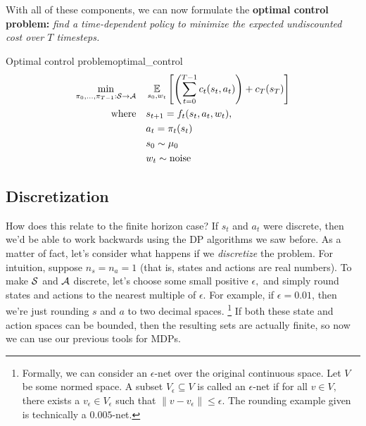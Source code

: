 \documentclass[../main/main]{subfiles}
\begin{document}
With all of these components, we can now formulate the \textbf{optimal control problem:} \emph{find a time-dependent policy to minimize the expected undiscounted cost over $T$ timesteps.}

\begin{definition}{Optimal control problem}{optimal_control}
    \begin{equation}
        \begin{split}
            \min_{\pi_0, \dots, \pi_{T-1} : \S \to \A} \quad & \E_{s_0, w_t} \left[
                \left( \sum_{t=0}^{T-1} c_t(s_t, a_t) \right) + c_T(s_T)
            \right] \\
            \text{where} \quad & s_{t+1} = f_t(s_t, a_t, w_t), \\
            & a_t = \pi_t(s_t) \\
            & s_0 \sim \mu_0 \\
            & w_t \sim \text{noise}
        \end{split}
    \end{equation}
\end{definition}


\subsection{Discretization}

How does this relate to the finite horizon case?
If $s_t$ and $a_t$ were discrete, then we'd be able to work backwards using
the DP algorithms we saw before.
As a matter of fact, let's consider what happens if we \emph{discretize} the
problem. For intuition, suppose $n_s = n_a = 1$ (that is, states and actions are real numbers).
To make $\S$ and $\A$ discrete, let's choose some small positive $\epsilon,$
and simply round states and actions to the nearest multiple of
$\epsilon.$ For example, if $\epsilon = 0.01$, then we're just rounding $s$ and $a$ to two decimal spaces. \footnote{Formally, we can consider an $\epsilon$-net over the original continuous space. Let $V$ be some normed space. A subset $V_\epsilon \subseteq V$ is called an $\epsilon$-net if for all $v \in V,$ there exists a $v_\epsilon \in V_\epsilon$ such that $\|v - v_\epsilon\| \le \epsilon.$ The rounding example given is technically a $0.005$-net.} If both these state and action spaces can be bounded, then the resulting sets are actually finite, so now we can use our previous tools for MDPs.
\end{document}
